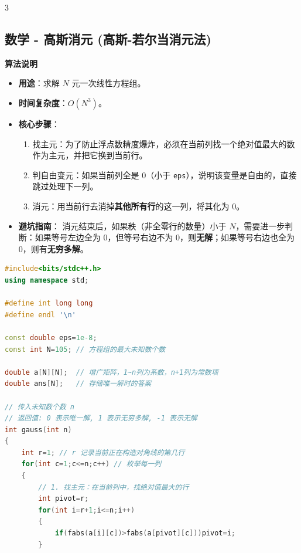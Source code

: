 \documentclass[10pt,landscape,a4paper]{article}
\begin{document}
\begin{multicols*}{3}
\subsection*{数学 - 高斯消元 (高斯-若尔当消元法)}
\par\addvspace{0.7ex}\noindent\textbf{算法说明}\par\nobreak
\begin{itemize}
\item \textbf{用途}：求解 $N$ 元一次线性方程组。
\item \textbf{时间复杂度}：$O(N^3)$。
\item \textbf{核心步骤}：
\begin{enumerate}[start=1]
\item 找主元：为了防止浮点数精度爆炸，必须在当前列找一个绝对值最大的数作为主元，并把它换到当前行。
\item 判自由变元：如果当前列全是 0（小于 \texttt{e\allowbreak{}p\allowbreak{}s}），说明该变量是自由的，直接跳过处理下一列。
\item 消元：用当前行去消掉\textbf{其他所有行}的这一列，将其化为 0。
\end{enumerate}
\item \textbf{避坑指南}：
消元结束后，如果秩（非全零行的数量）小于 $N$，需要进一步判断：如果等号左边全为 0，但等号右边不为 0，则\textbf{无解}；如果等号右边也全为 0，则有\textbf{无穷多解}。\par
\end{itemize}
\par{}\par
\begin{lstlisting}[language=C++]
#include<bits/stdc++.h>
using namespace std;

#define int long long
#define endl '\n'

const double eps=1e-8;
const int N=105; // 方程组的最大未知数个数

double a[N][N];  // 增广矩阵，1~n列为系数，n+1列为常数项
double ans[N];   // 存储唯一解时的答案

// 传入未知数个数 n
// 返回值: 0 表示唯一解, 1 表示无穷多解, -1 表示无解
int gauss(int n)
{
    int r=1; // r 记录当前正在构造对角线的第几行
    for(int c=1;c<=n;c++) // 枚举每一列
    {
        // 1. 找主元：在当前列中，找绝对值最大的行
        int pivot=r;
        for(int i=r+1;i<=n;i++)
        {
            if(fabs(a[i][c])>fabs(a[pivot][c]))pivot=i;
        }
        

\end{lstlisting}
\end{multicols*}
\end{document}
